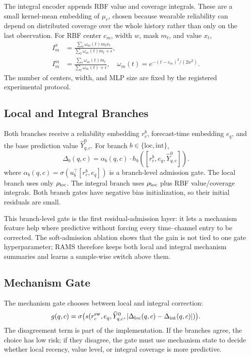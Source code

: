 ﻿\documentclass[10pt,conference]{IEEEtran}
\newcommand{\method}{\textnormal{\mbox{RAMS}}}
\begin{document}
The integral encoder appends RBF value and coverage integrals.  These are a
small kernel-mean embedding of \(\mu_c\), chosen because wearable reliability
can depend on distributed coverage over the whole history rather than only on
the last observation.  For RBF center \(c_m\), width \(w\), mask \(m_t\), and
value \(x_t\),
\begin{equation}
\begin{aligned}
I_m^x &=
\frac{\sum_t \omega_m(t)m_t x_t}
     {\sum_t \omega_m(t)m_t+\epsilon},\\
I_m^m &=
\frac{\sum_t \omega_m(t)m_t}
     {\sum_t \omega_m(t)+\epsilon},
\quad
\omega_m(t)=e^{-(t-c_m)^2/(2w^2)} .
\end{aligned}
\end{equation}
The number of centers, width, and MLP size are fixed by the registered
experimental protocol.

\subsection{Local and Integral Branches}

Both branches receive a reliability embedding \(r_c^b\), forecast-time
embedding \(e_q\), and the base prediction value
\(\widehat{Y}^{0}_{q,c}\).  For branch
\(b\in\{\mathrm{loc},\mathrm{int}\}\),
\begin{equation}
\Delta_b(q,c)
=
\alpha_b(q,c)
\cdot
h_b([r_c^b,e_q,\widehat{Y}^{0}_{q,c}]).
\end{equation}
where \(\alpha_b(q,c)=\sigma(u_b^\top[r_c^b,e_q])\) is a branch-level
admission gate.
The local branch uses only \(\rho_{\rm loc}\).  The integral branch uses
\(\rho_{\rm loc}\) plus RBF value/coverage integrals.  Both branch gates have
negative bias initialization, so their initial residuals are small.

This branch-level gate is the first residual-admission layer: it lets a
mechanism feature help where predictive without forcing every time--channel
entry to be corrected.  The soft-admission ablation shows that the gain is not
tied to one gate hyperparameter; \method{} therefore keeps both local and
integral mechanism summaries and learns a sample-wise switch above them.

\subsection{Mechanism Gate}

The mechanism gate chooses between local and integral correction:
\begin{equation}
g(q,c)=\sigma\big(s(r_c^{\rm sw},e_q,\widehat{Y}^{0}_{q,c},
|\Delta_{\rm loc}(q,c)-\Delta_{\rm int}(q,c)|)\big).
\end{equation}
The disagreement term is part of the implementation.  If the branches agree,
the choice has low risk; if they disagree, the gate must use mechanism state
to decide whether local recency, value level, or integral coverage is more
predictive.
\end{document}
